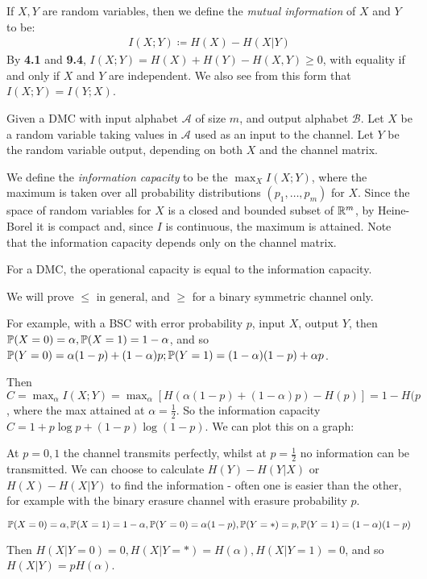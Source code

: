 \documentclass[10pt,a4paper]{article}
\begin{document}
If $X,Y$ are random variables, then we define the \emph{mutual information} of $X$ and $Y$ to be:
\begin{align*}
I(X;Y) \coloneqq H(X) - H(X|Y)
\end{align*}
By \textbf{4.1} and \textbf{9.4}, $I(X;Y) = H(X) + H(Y) - H(X,Y) \geq 0$, with equality if and only if $X$ and $Y$ are independent. We also see from this form that $I(X;Y) = I(Y;X)$.

Given a DMC with input alphabet $\mathscr{A}$ of size $m$, and output alphabet $\mathscr{B}$. Let $X$ be a random variable taking values in $\mathscr{A}$ used as an input to the channel. Let $Y$ be the random variable output, depending on both $X$ and the channel matrix.

We define the \emph{information capacity} to be the $\max_X I(X;Y)$, where the maximum is taken over all probability distributions $(p_1, \ldots, p_m)$ for $X$. Since the space of random variables for $X$ is a closed and bounded subset of $\R^m$, by Heine-Borel it is compact and, since $I$ is continuous, the maximum is attained. Note that the information capacity depends only on the channel matrix.

\begin{theorem}
For a DMC, the operational capacity is equal to the information capacity.
\end{theorem}
We will prove $\leq$ in general, and $\geq$ for a binary symmetric channel only. 

For example, with a BSC with error probability $p$, input $X$, output $Y$, then $\P(X=0) = \alpha, \P(X=1) = 1-\alpha$, and so $\P(Y=0) = \alpha(1-p) + (1-\alpha)p; \P(Y=1) = (1-\alpha)(1-p) + \alpha p$.

Then $C = \max_{\alpha} I(X;Y) = \max_\alpha \left[H(\alpha(1-p) + (1-\alpha)p) - H(p)\right] = 1-H(p$, where the max attained at $\alpha = \frac12$. So the information capacity $C = 1+p\log p + (1-p)\log(1-p)$. We can plot this on a graph:
\begin{figure}[H]
\centering
{}
\end{figure}
At $p=0,1$ the channel transmits perfectly, whilst at $p=\frac{1}{2}$ no information can be transmitted. We can choose to calculate $H(Y)-H(Y|X)$ or $H(X)-H(X|Y)$ to find the information - often one is easier than the other, for example with the binary erasure channel with erasure probability $p$.

$\P(X=0) = \alpha, \P(X=1) = 1-\alpha, \P(Y = 0) = \alpha(1-p), \P(Y=\ast) = p, \P(Y=1) =(1-\alpha)(1-p)$

Then $H(X|Y=0) = 0, H(X|Y = \ast) = H(\alpha), H(X|Y = 1) = 0$, and so $H(X|Y) = pH(\alpha)$.
\end{document}
